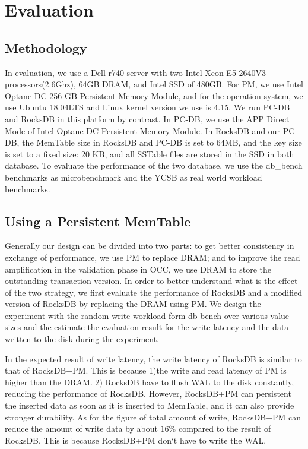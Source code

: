 \section{Evaluation}
\subsection{Methodology}
In evaluation, we use a Dell r740 server with two Intel Xeon E5-2640V3 processors(2.6Ghz), 64GB DRAM, and Intel SSD of 480GB. For PM, we use Intel Optane DC 256 GB Persistent Memory Module, and for the operation system, we use Ubuntu 18.04LTS and Linux kernel version we use is 4.15.
We run PC-DB and RocksDB in this platform by contrast. In PC-DB, we use the APP Direct Mode of Intel Optane DC Persistent Memory Module. In RocksDB and our PC-DB, the MemTable size in RocksDB and PC-DB is set to 64MB, and the key size is set to a fixed size: 20 KB, and all SSTable files are stored in the SSD in both database. 
To evaluate the performance of the two database, we use the db\_bench benchmarks as microbenchmark and the YCSB as real world workload benchmarks.   
\subsection{Using a Persistent MemTable}
Generally our design can be divided into two parts: to get better consistency in exchange of performance, we use PM to replace DRAM; and to improve the read amplification in the validation phase in OCC, we use DRAM to store the outstanding transaction version. In order to better understand what is the effect of the two strategy, we first evaluate the performance of RocksDB and a modified version of RocksDB by replacing the DRAM using PM.  We design the experiment with the random write workload form db$\_$bench over various value sizes and the estimate the evaluation result for the write latency and the data written to the disk during the experiment. 

In the expected result of write latency, the write latency of RocksDB is similar to that of RocksDB+PM. This is because 1)the write and read latency of PM is higher than the DRAM. 2) RocksDB have to flush WAL to the disk constantly, reducing the performance of RocksDB. However, RocksDB+PM can persistent the inserted data as soon as it is inserted to MemTable, and it can also provide stronger durability. As for the figure of total amount of write, RocksDB+PM can reduce the amount of write data by about $16\%$ compared to the result of RocksDB. This is because RocksDB+PM don`t have to write the WAL. 
